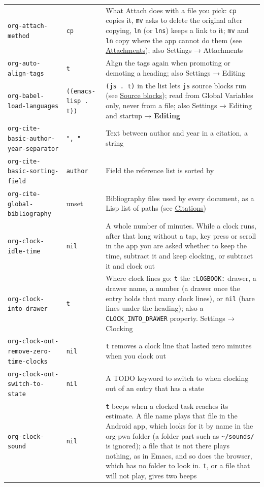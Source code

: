 \documentclass[11pt]{article}
\begin{document}
\begin{center}
\begin{tabular}{lll}
\texttt{org-attach-method} & \texttt{cp} & What Attach does with a file you pick: \texttt{cp} copies it, \texttt{mv} asks to delete the original after copying, \texttt{ln} (or \texttt{lns}) keeps a link to it; \texttt{mv} and \texttt{ln} copy where the app cannot do them (see \hyperref[sec:org970e59b]{Attachments}); also Settings → Attachments\\[0pt]
\texttt{org-auto-align-tags} & \texttt{t} & Align the tags again when promoting or demoting a heading; also Settings → Editing\\[0pt]
\texttt{org-babel-load-languages} & \texttt{((emacs-lisp . t))} & \texttt{(js . t)} in the list lets \texttt{js} source blocks run (see \hyperref[sec:org2fd54e4]{Source blocks}); read from Global Variables only, never from a file; also Settings → Editing and startup → \textbf{Editing}\\[0pt]
\texttt{org-cite-basic-author-year-separator} & \texttt{", "} & Text between author and year in a citation, a string\\[0pt]
\texttt{org-cite-basic-sorting-field} & \texttt{author} & Field the reference list is sorted by\\[0pt]
\texttt{org-cite-global-bibliography} & unset & Bibliography files used by every document, as a Lisp list of paths (see \hyperref[sec:org1a3b79e]{Citations})\\[0pt]
\texttt{org-clock-idle-time} & \texttt{nil} & A whole number of minutes. While a clock runs, after that long without a tap, key press or scroll in the app you are asked whether to keep the time, subtract it and keep clocking, or subtract it and clock out\\[0pt]
\texttt{org-clock-into-drawer} & \texttt{t} & Where clock lines go: \texttt{t} the \texttt{:LOGBOOK:} drawer, a drawer name, a number (a drawer once the entry holds that many clock lines), or \texttt{nil} (bare lines under the heading); also a \texttt{CLOCK\_INTO\_DRAWER} property. Settings → Clocking\\[0pt]
\texttt{org-clock-out-remove-zero-time-clocks} & \texttt{nil} & \texttt{t} removes a clock line that lasted zero minutes when you clock out\\[0pt]
\texttt{org-clock-out-switch-to-state} & \texttt{nil} & A TODO keyword to switch to when clocking out of an entry that has a state\\[0pt]
\texttt{org-clock-sound} & \texttt{nil} & \texttt{t} beeps when a clocked task reaches its estimate. A file name plays that file in the Android app, which looks for it by name in the org-pwa folder (a folder part such as \texttt{\textasciitilde{}/sounds/} is ignored); a file that is not there plays nothing, as in Emacs, and so does the browser, which has no folder to look in. \texttt{t}, or a file that will not play, gives two beeps\\[0pt]

\end{tabular}
\end{center}
\end{document}
